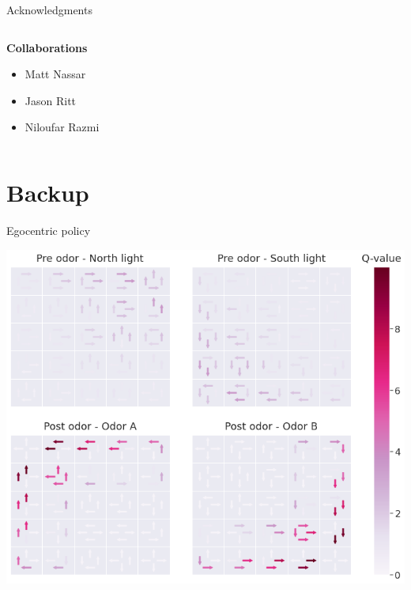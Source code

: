 \documentclass[bigger]{beamer}
\begin{document}
{\begin{frame}{Acknowledgments}
\begin{columns}[T]
        \begin{column}{0.5\textwidth}
            \begin{tcolorbox}[opacityfill=0.1, arc=0mm, size=fbox, coltext=white, colback=black, colframe=black]
                \small
                \centering
                \textbf{Collaborations}
                \begin{itemize}[noitemsep, before=\color{white}\bfseries]
                    \scriptsize
                    \item Matt Nassar
                    \item Jason Ritt
                    \item Niloufar Razmi
                \end{itemize}
            \end{tcolorbox}
        \end{column}
    \end{columns}
\end{frame}
}
\section{Backup}
\label{sec:orgb0cc0f8}
\begin{frame}[label={sec:org44f3849}]{Egocentric policy}
\addtocounter{framenumber}{-1}
\begin{center}
\includegraphics[width=.9\linewidth]{img/policy-ego-joint-repr.png}
\end{center}
\end{frame}
\end{document}

